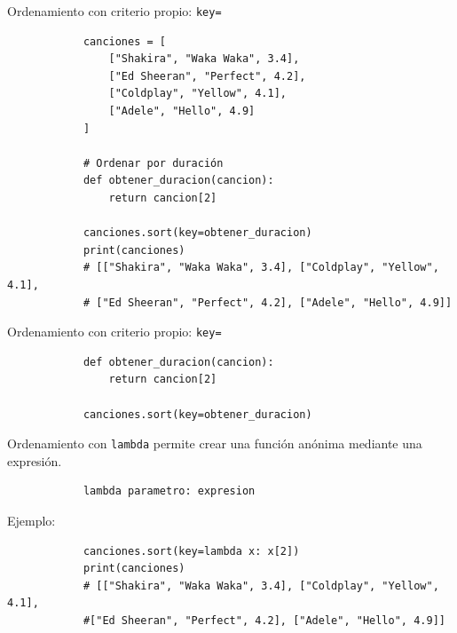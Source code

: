 \documentclass{beamer}
\begin{document}
    \begin{frame}[fragile, t]{Ordenamiento con criterio propio: \texttt{key=}}
        \begin{verbatim}
            canciones = [
                ["Shakira", "Waka Waka", 3.4],
                ["Ed Sheeran", "Perfect", 4.2],
                ["Coldplay", "Yellow", 4.1],
                ["Adele", "Hello", 4.9]
            ]

            # Ordenar por duración
            def obtener_duracion(cancion):
                return cancion[2]
            
            canciones.sort(key=obtener_duracion)
            print(canciones)
            # [["Shakira", "Waka Waka", 3.4], ["Coldplay", "Yellow", 4.1], 
            # ["Ed Sheeran", "Perfect", 4.2], ["Adele", "Hello", 4.9]]
        \end{verbatim}
    \end{frame}

    \begin{frame}[fragile, t]{Ordenamiento con criterio propio: \texttt{key=}}
        \begin{verbatim}
            def obtener_duracion(cancion):
                return cancion[2]
            
            canciones.sort(key=obtener_duracion)
        \end{verbatim}

        Ordenamiento con \texttt{lambda} permite crear una función anónima mediante una expresión.

        \begin{verbatim}
            lambda parametro: expresion
        \end{verbatim}

        Ejemplo:
        \begin{verbatim}
            canciones.sort(key=lambda x: x[2])
            print(canciones)
            # [["Shakira", "Waka Waka", 3.4], ["Coldplay", "Yellow", 4.1], 
            #["Ed Sheeran", "Perfect", 4.2], ["Adele", "Hello", 4.9]]
        \end{verbatim}
    \end{frame}
\end{document}
